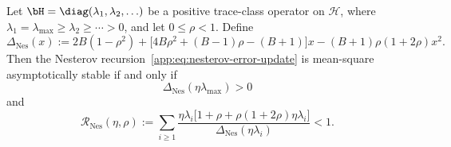 \begin{theorem}
\label{app:thm:nesterov-stability}
Let \(\bH=\diag(\lambda_1,\lambda_2,\ldots)\) be a positive trace-class operator on \(\mathcal H\), where \(\lambda_1=\lambda_{\max}\geq\lambda_2\geq\cdots>0\), and let \(0\leq\rho<1\). Define
\[
\Delta_{\mathrm{Nes}}(x):=2B(1-\rho^2)+\big[4B\rho^2+(B-1)\rho-(B+1)\big]x-(B+1)\rho(1+2\rho)x^2.
\]
Then the Nesterov recursion~\eqref{app:eq:nesterov-error-update} is mean-square asymptotically stable if and only if
\begin{equation}
\label{app:eq:nesterov-local-condition}
\Delta_{\mathrm{Nes}}(\eta\lambda_{\max})>0
\end{equation}
and
\begin{equation}
\label{app:eq:nesterov-global-condition}
\mathcal R_{\mathrm{Nes}}(\eta,\rho):=\sum_{i\geq1}\frac{\eta\lambda_i\big[1+\rho+\rho(1+2\rho)\eta\lambda_i\big]}{\Delta_{\mathrm{Nes}}(\eta\lambda_i)}<1.
\end{equation}
\end{theorem}

